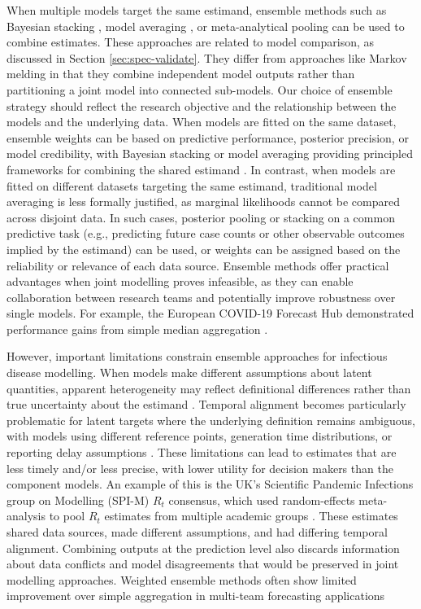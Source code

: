 \documentclass{article}
\begin{document}
When multiple models target the same estimand, ensemble methods such as Bayesian stacking \citep{yao2018using}, model averaging \citep{hoeting1999bayesian}, or meta-analytical pooling \citep{jackson2011multivariate} can be used to combine estimates.
These approaches are related to model comparison, as discussed in Section \ref{sec:spec-validate}.
They differ from approaches like Markov melding in that they combine independent model outputs rather than partitioning a joint model into connected sub-models. Our choice of ensemble strategy should reflect the research objective and the relationship between the models and the underlying data. When models are fitted on the same dataset, ensemble weights can be based on predictive performance, posterior precision, or model credibility, with Bayesian stacking or model averaging providing principled frameworks for combining the shared estimand \citep{yao2018using}. In contrast, when models are fitted on different datasets targeting the same estimand, traditional model averaging is less formally justified, as marginal likelihoods cannot be compared across disjoint data. In such cases, posterior pooling or stacking on a common predictive task (e.g., predicting future case counts or other observable outcomes implied by the estimand) can be used, or weights can be assigned based on the reliability or relevance of each data source. Ensemble methods offer practical advantages when joint modelling proves infeasible, as they can enable collaboration between research teams and potentially improve robustness over single models.
For example, the European COVID-19 Forecast Hub demonstrated performance gains from simple median aggregation \citep{sherratt2021exploring}. 

However, important limitations constrain ensemble approaches for infectious disease modelling.
When models make different assumptions about latent quantities, apparent heterogeneity may reflect definitional differences rather than true uncertainty about the estimand \citep{brockhaus2023why}.
Temporal alignment becomes particularly problematic for latent targets where the underlying definition remains ambiguous, with models using different reference points, generation time distributions, or reporting delay assumptions \citep{brockhaus2023why}.
These limitations can lead to estimates that are less timely and/or less precise, with lower utility for decision makers than the component models.
An example of this is the UK's Scientific Pandemic Infections group on Modelling (SPI-M) $R_t$ consensus, which used random-effects meta-analysis to pool $R_t$ estimates from multiple academic groups \citep{manley2024combining}. These estimates shared data sources, made different assumptions, and had differing temporal alignment.
Combining outputs at the prediction level also discards information about data conflicts and model disagreements that would be preserved in joint modelling approaches.
Weighted ensemble methods often show limited improvement over simple aggregation in multi-team forecasting applications \citep{sherratt2021exploring}
\end{document}
